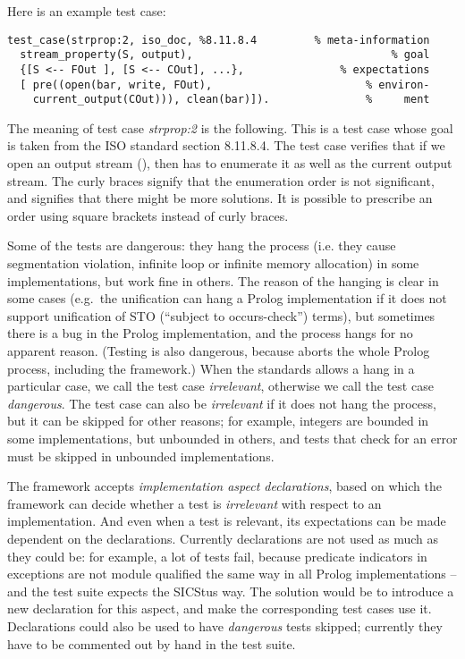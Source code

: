 \documentclass[draft]{llncs}%
\begin{document}
\noindent
Here is an example test case:
%
\begin{verbatim}
test_case(strprop:2, iso_doc, %8.11.8.4         % meta-information
  stream_property(S, output),                               % goal
  {[S <-- FOut ], [S <-- COut], ...},               % expectations
  [ pre((open(bar, write, FOut),                        % environ-
    current_output(COut))), clean(bar)]).               %     ment
\end{verbatim}
%
The meaning of test case \emph{strprop:2} is the following. This
is a test case whose goal is taken from the ISO standard section 8.11.8.4. 
The test case verifies that if we open an output stream (), then
 has to
enumerate it as well as the current
output stream. The curly braces signify that the enumeration order is not 
significant, and  signifies that there might be more solutions.
It is possible to prescribe an order using square brackets instead of curly
braces.

Some of the tests are dangerous: they hang the process (i.e. they cause
segmentation violation, infinite loop or infinite memory allocation)
in some implementations, but work fine in others. The reason of the hanging
is clear in some cases (e.g.\ the unification
 can hang a Prolog implementation if it does not support
unification of STO (``subject to occurs-check'') terms), but sometimes there is
a bug in the Prolog implementation, and the process hangs for no apparent
reason. (Testing  is also dangerous, because 
aborts the whole Prolog process, including the framework.)
When the standards allows a hang in a particular case,
we call the test case \emph{irrelevant}, otherwise we call the test
case \emph{dangerous}. The test case can also be \emph{irrelevant} if it
does not hang the process, but it can be skipped for other reasons;
for example,
integers are bounded in some implementations, but unbounded in others, and
tests that check for an  error must be skipped in
unbounded implementations.

The framework accepts \emph{implementation aspect declarations},
based on which the framework can decide whether a test is
\emph{irrelevant} with respect to an implementation. And even when a test is
relevant, its expectations can be made dependent on the declarations.
Currently
declarations are not used as much as they could be: for example, a lot of
tests fail, because predicate indicators in exceptions are not module
qualified the same way in all Prolog implementations -- and the test suite
expects the SICStus way. The solution would be to introduce a new
declaration for this aspect, and make the corresponding test cases use it.
Declarations could also be used to have \emph{dangerous} tests skipped;
currently they have to be commented out by hand in the test suite.
\end{document}
